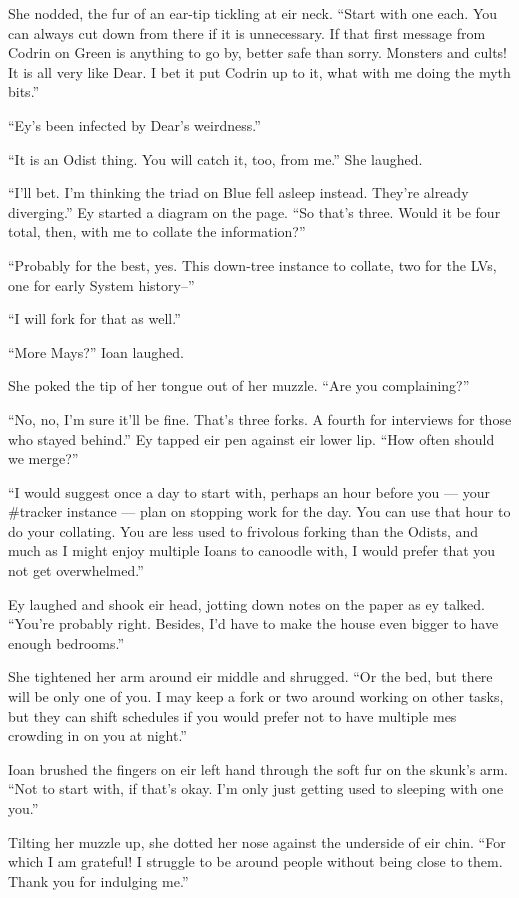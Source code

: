 She nodded, the fur of an ear-tip tickling at eir neck. ``Start with one each. You can always cut down from there if it is unnecessary. If that first message from Codrin on Green is anything to go by, better safe than sorry. Monsters and cults! It is all very like Dear. I bet it put Codrin up to it, what with me doing the myth bits.''

``Ey's been infected by Dear's weirdness.''

``It is an Odist thing. You will catch it, too, from me.'' She laughed.

``I'll bet. I'm thinking the triad on Blue fell asleep instead. They're already diverging.'' Ey started a diagram on the page. ``So that's three. Would it be four total, then, with me to collate the information?''

``Probably for the best, yes. This down-tree instance to collate, two for the LVs, one for early System history--''

``I will fork for that as well.''

``More Mays?'' Ioan laughed.

She poked the tip of her tongue out of her muzzle. ``Are you complaining?''

``No, no, I'm sure it'll be fine. That's three forks. A fourth for interviews for those who stayed behind.'' Ey tapped eir pen against eir lower lip. ``How often should we merge?''

``I would suggest once a day to start with, perhaps an hour before you — your \#tracker instance — plan on stopping work for the day. You can use that hour to do your collating. You are less used to frivolous forking than the Odists, and much as I might enjoy multiple Ioans to canoodle with, I would prefer that you not get overwhelmed.''

Ey laughed and shook eir head, jotting down notes on the paper as ey talked. ``You're probably right. Besides, I'd have to make the house even bigger to have enough bedrooms.''

She tightened her arm around eir middle and shrugged. ``Or the bed, but there will be only one of you. I may keep a fork or two around working on other tasks, but they can shift schedules if you would prefer not to have multiple mes crowding in on you at night.''

Ioan brushed the fingers on eir left hand through the soft fur on the skunk's arm. ``Not to start with, if that's okay. I'm only just getting used to sleeping with one you.''

Tilting her muzzle up, she dotted her nose against the underside of eir chin. ``For which I am grateful! I struggle to be around people without being close to them. Thank you for indulging me.''

